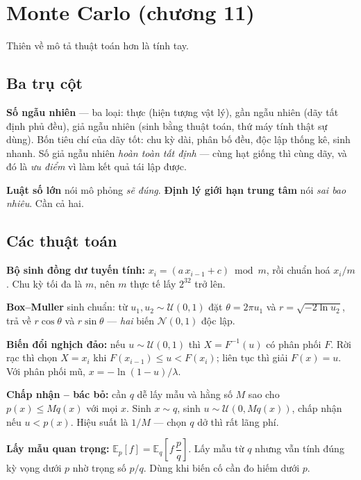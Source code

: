 \documentclass[11pt]{article}
\begin{document}
\section{Monte Carlo (chương 11)}

Thiên về mô tả thuật toán hơn là tính tay.

\subsection*{Ba trụ cột}

\textbf{Số ngẫu nhiên} --- ba loại: thực (hiện tượng vật lý), gần ngẫu nhiên (dãy
tất định phủ đều), giả ngẫu nhiên (sinh bằng thuật toán, thứ máy tính thật sự
dùng). Bốn tiêu chí của dãy tốt: chu kỳ dài, phân bố đều, độc lập thống kê, sinh
nhanh. Số giả ngẫu nhiên \emph{hoàn toàn tất định} --- cùng hạt giống thì cùng dãy,
và đó là \emph{ưu điểm} vì làm kết quả tái lập được.

\textbf{Luật số lớn} nói mô phỏng \emph{sẽ đúng}. \textbf{Định lý giới hạn trung
tâm} nói \emph{sai bao nhiêu}. Cần cả hai.

\subsection*{Các thuật toán}

\textbf{Bộ sinh đồng dư tuyến tính:} $x_i = (a\,x_{i-1}+c) \bmod m$, rồi chuẩn hoá
$x_i/m$. Chu kỳ tối đa là $m$, nên $m$ thực tế lấy $2^{32}$ trở lên.

\textbf{Box--Muller} sinh chuẩn: từ $u_1,u_2 \sim \mathcal{U}(0,1)$ đặt
$\theta = 2\pi u_1$ và $r = \sqrt{-2\ln u_2}$, trả về $r\cos\theta$ và
$r\sin\theta$ --- \emph{hai} biến $\mathcal{N}(0,1)$ độc lập.

\textbf{Biến đổi nghịch đảo:} nếu $u \sim \mathcal{U}(0,1)$ thì $X = F^{-1}(u)$ có
phân phối $F$. Rời rạc thì chọn $X = x_i$ khi $F(x_{i-1}) \le u < F(x_i)$; liên tục
thì giải $F(x)=u$. Với phân phối mũ, $x = -\ln(1-u)/\lambda$.

\textbf{Chấp nhận -- bác bỏ:} cần $q$ dễ lấy mẫu và hằng số $M$ sao cho
$p(x) \le Mq(x)$ với mọi $x$. Sinh $x \sim q$, sinh $u \sim \mathcal{U}(0, Mq(x))$,
chấp nhận nếu $u < p(x)$. Hiệu suất là $1/M$ --- chọn $q$ dở thì rất lãng phí.

\textbf{Lấy mẫu quan trọng:}
$\mathbb{E}_{p}[f] = \mathbb{E}_{q}\!\left[f\,\dfrac{p}{q}\right]$.
Lấy mẫu từ $q$ nhưng vẫn tính đúng kỳ vọng dưới $p$ nhờ trọng số $p/q$. Dùng khi
biến cố cần đo hiếm dưới $p$.
\end{document}
